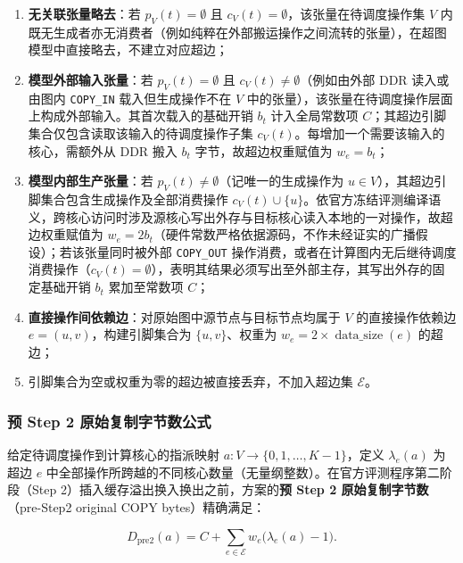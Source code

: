 \documentclass[anonymous,withtoc]{gmcm2026}
\providecommand{\tightlist}{\setlength{\itemsep}{0pt}\setlength{\parskip}{0pt}}
\begin{document}
\begin{enumerate}
\def\labelenumi{\arabic{enumi}.}
\tightlist
\item
  \textbf{无关联张量略去}：若 \(p_V(t) = \emptyset\) 且 \(c_V(t) = \emptyset\)，该张量在待调度操作集 \(V\) 内既无生成者亦无消费者（例如纯粹在外部搬运操作之间流转的张量），在超图模型中直接略去，不建立对应超边；
\item
  \textbf{模型外部输入张量}：若 \(p_V(t) = \emptyset\) 且 \(c_V(t) \ne \emptyset\)（例如由外部 DDR 读入或由图内 \texttt{COPY\_IN} 载入但生成操作不在 \(V\) 中的张量），该张量在待调度操作层面上构成外部输入。其首次载入的基础开销 \(b_t\) 计入全局常数项 \(C\)；其超边引脚集合仅包含读取该输入的待调度操作子集 \(c_V(t)\)。每增加一个需要该输入的核心，需额外从 DDR 搬入 \(b_t\) 字节，故超边权重赋值为 \(w_e = b_t\)；
\item
  \textbf{模型内部生产张量}：若 \(p_V(t) \ne \emptyset\)（记唯一的生成操作为 \(u \in V\)），其超边引脚集合包含生成操作及全部消费操作 \(c_V(t) \cup \{u\}\)。依官方冻结评测编译语义，跨核心访问时涉及源核心写出外存与目标核心读入本地的一对操作，故超边权重赋值为 \(w_e = 2b_t\)（硬件常数严格依据源码，不作未经证实的广播假设）；若该张量同时被外部 \texttt{COPY\_OUT} 操作消费，或者在计算图内无后继待调度消费操作（\(c_V(t) = \emptyset\)），表明其结果必须写出至外部主存，其写出外存的固定基础开销 \(b_t\) 累加至常数项 \(C\)；
\item
  \textbf{直接操作间依赖边}：对原始图中源节点与目标节点均属于 \(V\) 的直接操作依赖边 \(e = (u, v)\)，构建引脚集合为 \(\{u, v\}\)、权重为 \(w_e = 2 \times \operatorname{data\_size}(e)\) 的超边；
\item
  引脚集合为空或权重为零的超边被直接丢弃，不加入超边集 \(\mathcal{E}\)。
\end{enumerate}

\subsubsection{预 Step 2 原始复制字节数公式}

给定待调度操作到计算核心的指派映射 \(a: V \to \{0, 1, \dots, K-1\}\)，定义 \(\lambda_e(a)\) 为超边 \(e\) 中全部操作所跨越的不同核心数量（无量纲整数）。在官方评测程序第二阶段（Step 2）插入缓存溢出换入换出之前，方案的\textbf{预 Step 2 原始复制字节数}（pre-Step2 original COPY bytes）精确满足：

\begin{equation}
D_{\mathrm{pre2}}(a) = C + \sum_{e \in \mathcal{E}} w_e \bigl(\lambda_e(a) - 1\bigr).
\end{equation}
\end{document}
